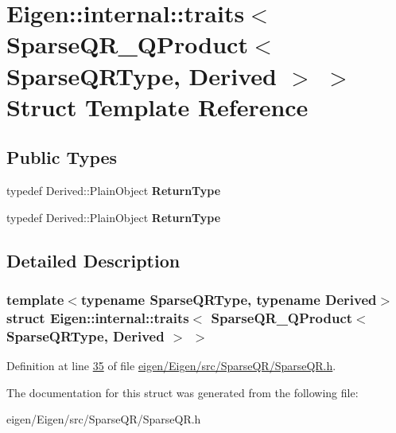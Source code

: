\hypertarget{struct_eigen_1_1internal_1_1traits_3_01_sparse_q_r___q_product_3_01_sparse_q_r_type_00_01_derived_01_4_01_4}{}\section{Eigen\+:\+:internal\+:\+:traits$<$ Sparse\+Q\+R\+\_\+\+Q\+Product$<$ Sparse\+Q\+R\+Type, Derived $>$ $>$ Struct Template Reference}
\label{struct_eigen_1_1internal_1_1traits_3_01_sparse_q_r___q_product_3_01_sparse_q_r_type_00_01_derived_01_4_01_4}
\subsection*{Public Types}
\begin{DoxyCompactItemize}
\item 
\mbox{\label{struct_eigen_1_1internal_1_1traits_3_01_sparse_q_r___q_product_3_01_sparse_q_r_type_00_01_derived_01_4_01_4_ae1e596296cf3e313d0248b6ffadd37d4}} 
typedef Derived\+::\+Plain\+Object {\bfseries Return\+Type}
\item 
\mbox{\label{struct_eigen_1_1internal_1_1traits_3_01_sparse_q_r___q_product_3_01_sparse_q_r_type_00_01_derived_01_4_01_4_ae1e596296cf3e313d0248b6ffadd37d4}} 
typedef Derived\+::\+Plain\+Object {\bfseries Return\+Type}
\end{DoxyCompactItemize}


\subsection{Detailed Description}
\subsubsection*{template$<$typename Sparse\+Q\+R\+Type, typename Derived$>$\newline
struct Eigen\+::internal\+::traits$<$ Sparse\+Q\+R\+\_\+\+Q\+Product$<$ Sparse\+Q\+R\+Type, Derived $>$ $>$}



Definition at line \hyperlink{eigen_2_eigen_2src_2_sparse_q_r_2_sparse_q_r_8h_source_l00035}{35} of file \hyperlink{eigen_2_eigen_2src_2_sparse_q_r_2_sparse_q_r_8h_source}{eigen/\+Eigen/src/\+Sparse\+Q\+R/\+Sparse\+Q\+R.\+h}.



The documentation for this struct was generated from the following file\+:\begin{DoxyCompactItemize}
\item 
eigen/\+Eigen/src/\+Sparse\+Q\+R/\+Sparse\+Q\+R.\+h\end{DoxyCompactItemize}
